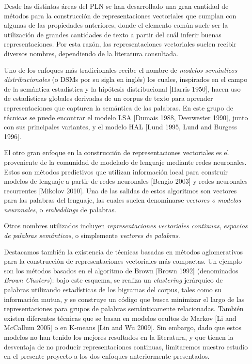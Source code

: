 Desde las distintas áreas del PLN se han desarrollado una gran cantidad de métodos para la
construcción de representaciones vectoriales que cumplan con algunas de las propiedades anteriores,
donde el elemento común suele ser la utilización de grandes cantidades de texto a partir del cuál
inferir buenas representaciones. Por esta razón, las representaciones vectoriales suelen recibir
diversos nombres, dependiendo de la literatura consultada.

Uno de los enfoques más tradicionales recibe el nombre de \textit{modelos semánticos
distribucionales} (o DSMs por su sigla en inglés) los cuales, inspirados en el campo de la semántica
estadística y la hipótesis distribucional [Harris 1950], hacen uso de estadísticas globales
derivadas de un corpus de texto para aprender representaciones que capturen la semántica de las
palabras. En este grupo de técnicas se puede encontrar el modelo LSA [Dumais 1988, Deerwester 1990],
junto con sus principales variantes, y el modelo HAL [Lund 1995, Lund and Burgess 1996].

El otro gran enfoque en la construcción de representaciones vectoriales es el proveniente de la
comunidad de modelado de lenguaje mediante redes neuronales. Estos son métodos predictivos que
utilizan información local para construir modelos de lenguaje a partir de redes neuronales [Bengio
2003] y redes neuronales recurrentes [Mikolov 2010]. Una de las salidas de estos algoritmos son
vectores para las palabras del lenguaje, las cuales suelen denominarse \textit{vectores o modelos
neuronales}, o \textit{embeddings} de palabras.

Otros nombres utilizados incluyen \textit{representaciones vectoriales continuas}, \textit{espacios
de palabras semánticos}, o simplemente \textit{vectores de palabras}.

Destacamos también la existencia de técnicas basadas en métodos aglomerativos para la construcción
de representaciones vectoriales más compactas. Un ejemplo son los métodos basados en el algoritmo de
Brown [Brown 1992] (denominados \textit{Brown Clusters}): bajo este esquema, se realiza un
\textit{clustering} jerárquico de palabras utilizando estadísticas de los bigramas del corpus, tales
como su información mutua, y se construye un código que busca minimizar el largo de las
representaciones para grupos de palabras semánticamente relacionadas. También existen diferentes
técnicas que se basan en modelos ocultos de Markov [Li and McCallum 2005] o en K-means [Lin and Wu
2009]. Sin embargo, dado que estos modelos no han tenido los mejores resultados en la literatura, y
que tienen la desventaja de no producir representaciones continuas, limitaremos nuestro estudio en
el presente proyecto a los dos enfoques anteriormente presentados.



